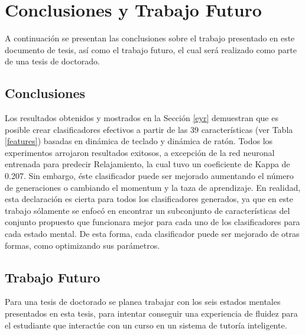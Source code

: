 
\chapter{Conclusiones y Trabajo Futuro}

A continuación se presentan las conclusiones sobre el trabajo
presentado en este documento de tesis, así como el trabajo futuro, el
cual será realizado como parte de una tesis de doctorado.

\section{Conclusiones}

Los resultados obtenidos y mostrados en la Sección \ref{eyr}
demuestran que es posible crear clasificadores efectivos a partir de
las 39 características (ver Tabla \ref{features}) basadas en dinámica
de teclado y dinámica de ratón. Todos los experimentos arrojaron
resultados exitosos, a excepción de la red neuronal entrenada para
predecir Relajamiento, la cual tuvo un coeficiente de Kappa de
0.207. Sin embargo, éste clasificador puede ser mejorado aumentando el
número de generaciones o cambiando el momentum y la taza de
aprendizaje. En realidad, esta declaración es cierta para todos los
clasificadores generados, ya que en este trabajo sólamente se enfocó
en encontrar un subconjunto de características del conjunto propuesto
que funcionara mejor para cada uno de los clasificadores para cada
estado mental. De esta forma, cada clasificador puede ser mejorado de
otras formas, como optimizando sus parámetros.


\section{Trabajo Futuro}

Para una tesis de doctorado se planea trabajar con los seis estados
mentales presentados en esta tesis, para intentar conseguir una
experiencia de fluidez para el estudiante que interactúe con un curso
en un sistema de tutoría inteligente.


